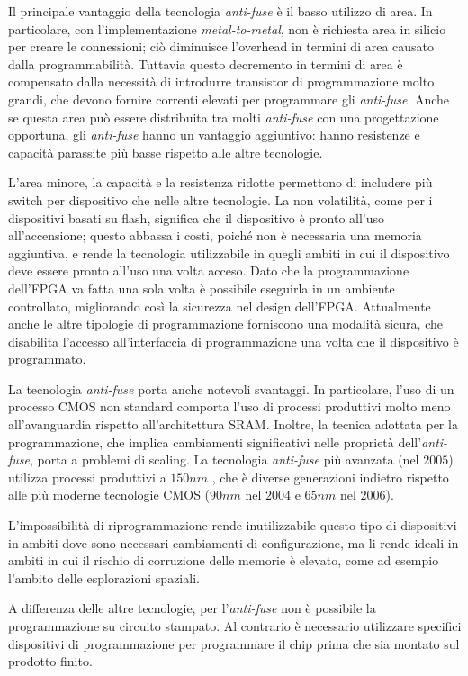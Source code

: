 Il principale vantaggio della tecnologia \textit{anti-fuse} è il basso utilizzo di area. In particolare, con l'implementazione \textit{metal-to-metal}, non è richiesta area in silicio per creare le connessioni; ciò diminuisce l'overhead in termini di area causato dalla programmabilità. Tuttavia questo decremento in termini di area è compensato dalla necessità di introdurre transistor di programmazione molto grandi, che devono fornire correnti elevati per programmare gli \textit{anti-fuse}. Anche se questa area può essere distribuita tra molti \textit{anti-fuse} con una progettazione opportuna, gli \textit{anti-fuse} hanno un vantaggio aggiuntivo: hanno resistenze e capacità parassite più basse rispetto alle altre tecnologie.

L'area minore, la capacità e la resistenza ridotte permettono di includere più switch per dispositivo che nelle altre tecnologie. La non volatilità, come per i dispositivi basati su flash, significa che il dispositivo è pronto all'uso all'accensione; questo abbassa i costi, poiché non è necessaria una memoria aggiuntiva, e rende la tecnologia utilizzabile in quegli ambiti in cui il dispositivo deve essere pronto all'uso una volta acceso. Dato che la programmazione dell'FPGA va fatta una sola volta è possibile eseguirla in un ambiente controllato, migliorando così la sicurezza nel design dell'FPGA. Attualmente anche le altre tipologie di programmazione forniscono una modalità sicura, che disabilita l'accesso all'interfaccia di programmazione una volta che il dispositivo è programmato.

La tecnologia \textit{anti-fuse} porta anche notevoli svantaggi. In particolare, l'uso di un processo CMOS non standard comporta l'uso di processi produttivi molto meno all'avanguardia rispetto all'architettura SRAM. Inoltre, la tecnica adottata per la programmazione, che implica cambiamenti significativi nelle proprietà dell'\textit{anti-fuse}, porta a problemi di scaling. La tecnologia \textit{anti-fuse} più avanzata (nel $2005$) utilizza processi produttivi a $150nm$ \cite{axfpga}, che è diverse generazioni indietro rispetto alle più moderne tecnologie CMOS ($90nm$ nel $2004$ e $65nm$ nel $2006$).

L'impossibilità di riprogrammazione rende inutilizzabile questo tipo di dispositivi in ambiti dove sono necessari cambiamenti di configurazione, ma li rende ideali in ambiti in cui il rischio di corruzione delle memorie è elevato, come ad esempio l'ambito delle esplorazioni spaziali.

A differenza delle altre tecnologie, per l'\textit{anti-fuse} non è possibile la programmazione su circuito stampato. Al contrario è necessario utilizzare specifici dispositivi di programmazione per programmare il chip prima che sia montato sul prodotto finito.

